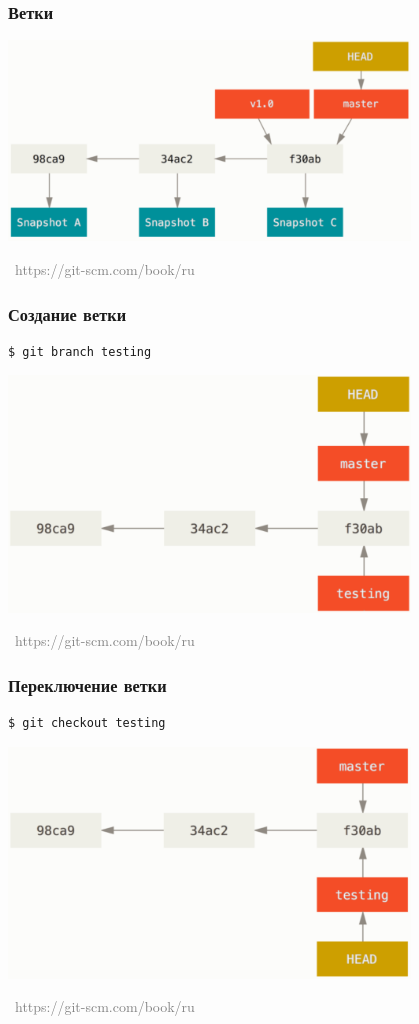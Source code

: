\documentclass[xetex,mathserif,serif]{beamer}
\newcommand{\attribution}[1] {
    \vspace{-5mm}\begin{flushright}\begin{scriptsize}\textcolor{gray}{\textcopyright\, #1}\end{scriptsize}\end{flushright}
}
\begin{document}
    \begin{frame}
        \frametitle{Ветки}
        \begin{center}
            \includegraphics[width=0.8\textwidth]{branches.png}
            \attribution{https://git-scm.com/book/ru}
        \end{center}
    \end{frame}

    \begin{frame}[fragile]
        \frametitle{Создание ветки}
        \begin{verbatim}
$ git branch testing
        \end{verbatim}
        \begin{center}
            \includegraphics[width=0.8\textwidth]{creatingBranch.png}
            \attribution{https://git-scm.com/book/ru}
        \end{center}
    \end{frame}

    \begin{frame}[fragile]
        \frametitle{Переключение ветки}
        \begin{verbatim}
$ git checkout testing
        \end{verbatim}
        \begin{center}
            \includegraphics[width=0.8\textwidth]{checkout.png}
            \attribution{https://git-scm.com/book/ru}
        \end{center}
    \end{frame}
\end{document}
